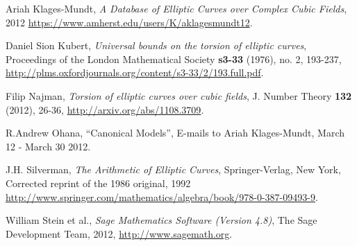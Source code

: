 \documentclass{amsart}
\theoremstyle{definition}
\begin{document}
\begin{thebibliography}{9}
	Ariah Klages-Mundt,
	\emph{A Database of Elliptic Curves over Complex Cubic Fields}, 2012
	\url{https://www.amherst.edu/users/K/aklagesmundt12}.

	Daniel Sion Kubert,
	\emph{Universal bounds on the torsion of elliptic curves},
	Proceedings of the London Mathematical Society \textbf{s3-33} (1976), no. 2, 193-237,
	\url{http://plms.oxfordjournals.org/content/s3-33/2/193.full.pdf}.

	Filip Najman,
	\emph{Torsion of elliptic curves over cubic fields},
	J. Number Theory \textbf{132} (2012), 26-36,
	\url{http://arxiv.org/abs/1108.3709}.

	R.\thinspace{}Andrew Ohana,
	``Canonical Models'',
	E-mails to Ariah Klages-Mundt,
	March 12 - March 30 2012.

	J.\thinspace{}H. Silverman,
	\emph{The Arithmetic of Elliptic Curves},
	Springer-Verlag, New York,
	Corrected reprint of the 1986 original, 1992
	\url{http://www.springer.com/mathematics/algebra/book/978-0-387-09493-9}.

	William Stein et al.,
	\emph{Sage Mathematics Software (Version 4.8)},
	The Sage Development Team, 2012,
	\url{http://www.sagemath.org}.

\end{thebibliography}
\end{document}
